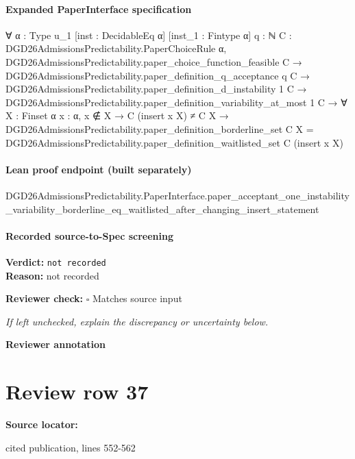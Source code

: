 \documentclass[10pt]{article}
\newcommand{\reviewerbox}{%
  \par\noindent\fbox{\parbox{0.96\linewidth}{\rule{0pt}{0.38in}}}\par
}
\newcommand{\reviewmatch}[1]{%
  \par\noindent\textbf{Reviewer check:} $\square$\; #1\par
  \noindent\emph{If left unchecked, explain the discrepancy or uncertainty below.}\par
}
\begin{document}
\paragraph{Expanded PaperInterface specification}
\begin{ReviewVerbatim}
∀ {α : Type u_1} [inst : DecidableEq α] [inst_1 : Fintype α] {q : ℕ}
  {C : DGD26AdmissionsPredictability.PaperChoiceRule α},
  DGD26AdmissionsPredictability.paper_choice_function_feasible C →
    DGD26AdmissionsPredictability.paper_definition_q_acceptance q C →
      DGD26AdmissionsPredictability.paper_definition_d_instability 1 C →
        DGD26AdmissionsPredictability.paper_definition_variability_at_most 1 C →
          ∀ {X : Finset α} {x : α},
            x ∉ X →
              C (insert x X) ≠ C X →
                DGD26AdmissionsPredictability.paper_definition_borderline_set C X =
                  DGD26AdmissionsPredictability.paper_definition_waitlisted_set C (insert x X)
\end{ReviewVerbatim}

\paragraph{Lean proof endpoint (built separately)}\begin{ReviewVerbatim}
DGD26AdmissionsPredictability.PaperInterface.paper_acceptant_one_instability_variability_borderline_eq_waitlisted_after_changing_insert_statement
\end{ReviewVerbatim}

\paragraph{Recorded source-to-Spec screening}
\textbf{Verdict:} \texttt{not recorded}
\\
\textbf{Reason:} not recorded
\reviewmatch{Matches source input}
\noindent\textbf{Reviewer annotation}\par
\reviewerbox
\clearpage
\hypertarget{source-claim-ef4d58145103cd0c}{}
\section*{Review row 37}
\textbf{Source locator:} {\footnotesize\raggedright cited publication, lines 552-\allowbreak{}562\par}
\end{document}
